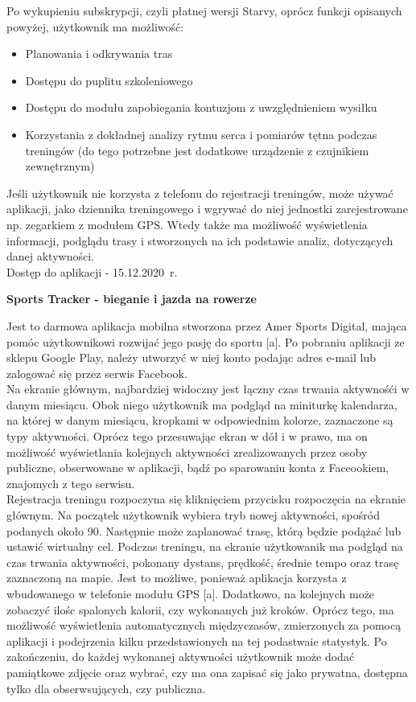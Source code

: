 \documentclass[a4paper,12pt,reqno]{article}
\begin{document}
Po wykupieniu subskrypcji, czyli płatnej wersji Starvy, oprócz funkcji opisanych powyżej, użytkownik ma możliwość:
\begin{itemize}
	\item Planowania i odkrywania tras
	\item Dostępu do puplitu szkoleniowego
	\item Dostępu do modułu zapobiegania kontuzjom z uwzględnieniem wysiłku
	\item Korzystania z dokładnej analizy rytmu serca i pomiarów tętna podczas treningów (do tego potrzebne jest dodatkowe urządzenie z czujnikiem zewnętrznym)
\end{itemize}

Jeśli użytkownik nie korzysta z telefonu do rejestracji treningów, może używać aplikacji, jako dziennika treningowego i wgrywać do niej jednostki zarejestrowane np. zegarkiem z modułem GPS. Wtedy także ma możliwość wyświetlenia informacji, podglądu trasy i stworzonych na ich podstawie analiz, dotyczących danej aktywności.\\

Dostęp do aplikacji - 15.12.2020~r.
\vspace{1cm}
\begin{flushleft}
	\textbf{Sports Tracker - bieganie i jazda na rowerze}
\end{flushleft}

Jest to darmowa aplikacja mobilna stworzona przez Amer Sports Digital, mająca pomóc użytkownikowi rozwijać jego pasję do sportu [a].
Po pobraniu aplikacji ze sklepu Google Play, należy utworzyć w niej konto podając adres e-mail lub zalogować się przez serwis Facebook.\\

Na ekranie głównym, najbardziej widoczny jest łączny czas trwania aktywnośći w  danym miesiącu. Obok niego użytkownik ma podgląd na miniturkę kalendarza, na której w danym miesiącu, kropkami w odpowiednim kolorze, zaznaczone są typy aktywności. Oprócz tego przesuwając ekran w dół i w prawo, ma on możliwość wyświetlania kolejnych aktywności zrealizowanych przez osoby publiczne, obserwowane w aplikacji, bądź po sparowaniu konta z Faceookiem, znajomych z tego serwisu.\\

Rejestracja treningu rozpoczyna się kliknięciem przycisku rozpoczęcia na ekranie głównym. Na początek użytkownik wybiera tryb nowej aktywności, spośród podanych około 90. Następnie może zaplanować trasę, którą będzie podążać lub ustawić wirtualny cel.
Podczas treningu, na ekranie użytkowanik ma podgląd na czas trwania aktywności, pokonany dystans, prędkość, średnie tempo oraz trasę zaznaczoną na mapie. Jest to możliwe, ponieważ aplikacja korzysta z wbudowanego w telefonie modułu GPS [a]. Dodatkowo, na kolejnych może zobaczyć ilośc spalonych kalorii, czy wykonanych już kroków. Oprócz tego, ma możliwość wyświetlenia automatycznych międzyczasów, zmierzonych za pomocą aplikacji i podejrzenia kilku przedstawionych na tej podastwaie statystyk.
Po zakończeniu, do każdej wykonanej aktywności użytkownik może dodać pamiątkowe zdjęcie oraz wybrać, czy ma ona zapisać się jako prywatna, dostępna tylko dla obserwsujących, czy publiczna.\\
\end{document}
